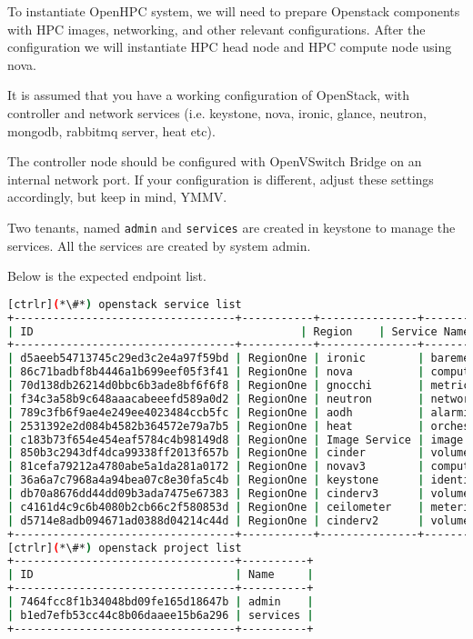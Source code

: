 	To instantiate OpenHPC system, we will need to prepare Openstack components with HPC images, networking, and other relevant configurations. After the configuration we will instantiate HPC head node and HPC compute node using nova. 

	It is assumed that you have a working configuration of OpenStack, with controller and network services (i.e. keystone, nova, ironic, glance, neutron, mongodb, rabbitmq server, heat etc). 

	The controller node should be configured with OpenVSwitch Bridge on an internal network port. If your configuration is different, adjust these settings accordingly, but keep in mind, YMMV.

	Two tenants, named \texttt{admin} and \texttt{services} are created in keystone to manage the services. All the services are created by system admin. 

	Below is the expected endpoint list.



\begin{lstlisting}[language=bash,keywords={}]
[ctrlr](*\#*) openstack service list
+----------------------------------+-----------+---------------+---------------+
| ID                                         | Region    | Service Name  | Service Type  |
+----------------------------------+-----------+---------------+---------------+
| d5aeeb54713745c29ed3c2e4a97f59bd | RegionOne | ironic        | baremetal     |
| 86c71badbf8b4446a1b699eef05f3f41 | RegionOne | nova          | compute       |
| 70d138db26214d0bbc6b3ade8bf6f6f8 | RegionOne | gnocchi       | metric        |
| f34c3a58b9c648aaacabeeefd589a0d2 | RegionOne | neutron       | network       |
| 789c3fb6f9ae4e249ee4023484ccb5fc | RegionOne | aodh          | alarming      |
| 2531392e2d084b4582b364572e79a7b5 | RegionOne | heat          | orchestration |
| c183b73f654e454eaf5784c4b98149d8 | RegionOne | Image Service | image         |
| 850b3c2943df4dca99338ff2013f657b | RegionOne | cinder        | volume        |
| 81cefa79212a4780abe5a1da281a0172 | RegionOne | novav3        | computev3     |
| 36a6a7c7968a4a94bea07c8e30fa5c4b | RegionOne | keystone      | identity      |
| db70a8676dd44dd09b3ada7475e67383 | RegionOne | cinderv3      | volumev3      |
| c4161d4c9c6b4080b2cb66c2f580853d | RegionOne | ceilometer    | metering      |
| d5714e8adb094671ad0388d04214c44d | RegionOne | cinderv2      | volumev2      |
+----------------------------------+-----------+---------------+---------------+
[ctrlr](*\#*) openstack project list
+----------------------------------+----------+
| ID                               | Name     |
+----------------------------------+----------+
| 7464fcc8f1b34048bd09fe165d18647b | admin    |
| b1ed7efb53cc44c8b06daaee15b6a296 | services |
+----------------------------------+----------+
\end{lstlisting}

